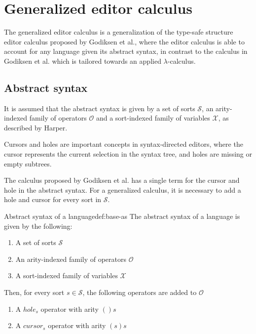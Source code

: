 \section{Generalized editor calculus}
The generalized editor calculus\cite{aalborg} is a generalization of the type-safe structure editor calculus proposed by Godiksen et al.\cite{godiksen}, where the editor calculus is able to account for any language given its abstract syntax, in contrast to the calculus in Godiksen\cite{godiksen} et al. which is tailored towards an applied $\lambda$-calculus.

\subsection{Abstract syntax}
It is assumed that the abstract syntax is given by a set of sorts $\mathcal{S}$, an arity-indexed family of operators $\mathcal{O}$ and a sort-indexed family of variables $\mathcal{X}$, as described by Harper\cite{harper}.

Cursors and holes are important concepts in syntax-directed editors, where the cursor represents the current selection in the syntax tree, and holes are missing or empty subtrees.

The calculus proposed by Godiksen et al. \cite{godiksen} has a single term for the cursor and hole in the abstract syntax. For a generalized calculus, it is necessary to add a hole and cursor for every sort in $\mathcal{S}$.

\begin{definition}{Abstract syntax of a language}{def:base-as}
    The abstract syntax of a language is given by the following:

    \begin{enumerate}
        \item A set of sorts $\mathcal{S}$
        \item An arity-indexed family of operators $\mathcal{O}$
        \item A sort-indexed family of variables $\mathcal{X}$
    \end{enumerate}

    Then, for every sort $s \in \mathcal{S}$, the following operators are added to $\mathcal{O}$

    \begin{enumerate}
        \item A $hole_s$ operator with arity $()s$
        \item A $cursor_s$ operator with arity $(s)s$
    \end{enumerate}
\end{definition}




